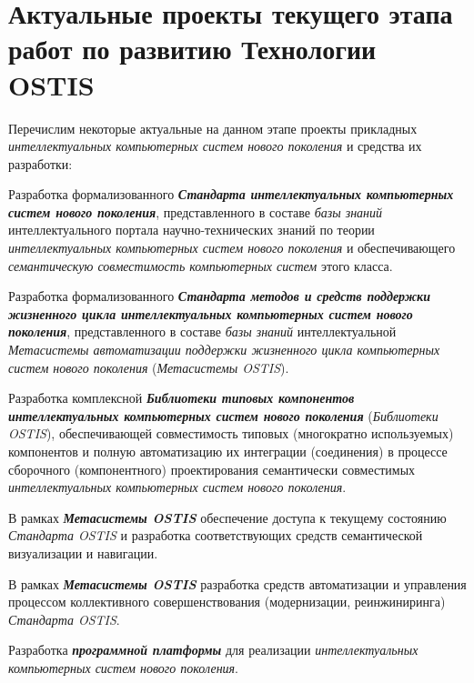 \section*{Актуальные проекты текущего этапа работ по развитию Технологии OSTIS}
\label{concl_actual_projects_current_stage_work_development_technology}

Перечислим некоторые актуальные на данном этапе проекты прикладных \textit{интеллектуальных компьютерных систем нового поколения} и средства их разработки:
\begin{textitemize}
	\item 
	Разработка формализованного \textbf{\textit{Стандарта интеллектуальных компьютерных систем нового поколения}}, представленного в составе \textit{базы знаний} интеллектуального портала научно-технических знаний по теории \textit{интеллектуальных компьютерных систем нового поколения} и обеспечивающего \textit{семантическую совместимость компьютерных систем} этого класса.
	
	\item 
	Разработка формализованного \textbf{\textit{Стандарта методов и средств поддержки жизненного цикла интеллектуальных компьютерных систем нового поколения}}, представленного в составе \textit{базы знаний} интеллектуальной \textit{Метасистемы автоматизации поддержки жизненного цикла компьютерных систем нового поколения} (\textit{Метасистемы OSTIS}).
	
	\item 
	Разработка комплексной \textbf{\textit{Библиотеки типовых компонентов интеллектуальных компьютерных систем нового поколения}} (\textit{Библиотеки OSTIS}), обеспечивающей совместимость типовых (многократно используемых) компонентов и полную автоматизацию их интеграции (соединения) в процессе сборочного (компонентного) проектирования семантически совместимых \textit{интеллектуальных компьютерных систем нового поколения}.
	
	\item 
	В рамках \textbf{\textit{Метасистемы OSTIS}} обеспечение  доступа к текущему состоянию \textit{Стандарта OSTIS} и разработка соответствующих средств семантической визуализации и навигации.
	
	\item 
	В рамках \textbf{\textit{Метасистемы OSTIS}} разработка средств автоматизации и управления процессом коллективного совершенствования (модернизации, реинжиниринга) \textit{Стандарта OSTIS}.
	
	\item
	Разработка \textbf{\textit{программной платформы}} для реализации \textit{интеллектуальных компьютерных систем нового поколения}.
	

\end{textitemize}
